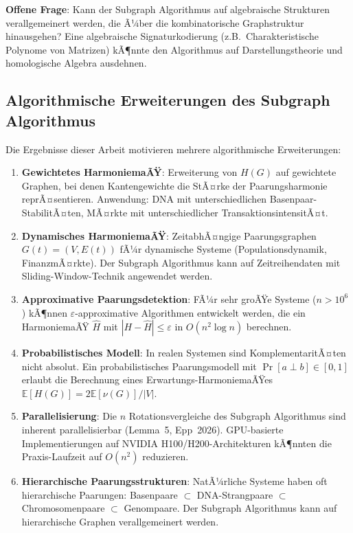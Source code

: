 ﻿\documentclass[a4paper,12pt]{article}
\theoremstyle{definition}
\begin{document}
\textbf{Offene Frage}: Kann der Subgraph Algorithmus auf algebraische Strukturen
verallgemeinert werden, die Ã¼ber die kombinatorische Graphstruktur hinausgehen?
Eine algebraische Signaturkodierung (z.B.\ Charakteristische Polynome von Matrizen)
kÃ¶nnte den Algorithmus auf Darstellungstheorie und homologische Algebra ausdehnen.

\subsection{Algorithmische Erweiterungen des Subgraph Algorithmus}

Die Ergebnisse dieser Arbeit motivieren mehrere algorithmische Erweiterungen:

\begin{enumerate}
	\item \textbf{Gewichtetes HarmoniemaÃŸ}: Erweiterung von $H(G)$ auf gewichtete
	Graphen, bei denen Kantengewichte die StÃ¤rke der Paarungsharmonie reprÃ¤sentieren.
	Anwendung: DNA mit unterschiedlichen Basenpaar-StabilitÃ¤ten, MÃ¤rkte mit
	unterschiedlicher TransaktionsintensitÃ¤t.
	
	\item \textbf{Dynamisches HarmoniemaÃŸ}: ZeitabhÃ¤ngige Paarungsgraphen
	$G(t) = (V, E(t))$ fÃ¼r dynamische Systeme (Populationsdynamik, FinanzmÃ¤rkte).
	Der Subgraph Algorithmus kann auf Zeitreihendaten mit Sliding-Window-Technik
	angewendet werden.
	
	\item \textbf{Approximative Paarungsdetektion}: FÃ¼r sehr groÃŸe Systeme
	($n > 10^6$) kÃ¶nnen $\varepsilon$-approximative Algorithmen entwickelt werden,
	die ein HarmoniemaÃŸ $\hat{H}$ mit $|H - \hat{H}| \leq \varepsilon$ in
	$O(n^2 \log n)$ berechnen.
	
	\item \textbf{Probabilistisches Modell}: In realen Systemen sind KomplementaritÃ¤ten
	nicht absolut. Ein probabilistisches Paarungsmodell mit $\Pr[a \perp b] \in [0,1]$
	erlaubt die Berechnung eines Erwartungs-HarmoniemaÃŸes
	$\mathbb{E}[H(G)] = 2\mathbb{E}[\nu(G)]/|V|$.
	
	\item \textbf{Parallelisierung}: Die $n$ Rotationsvergleiche des Subgraph Algorithmus
	sind inherent parallelisierbar (Lemma~5, Epp~2026). GPU-basierte Implementierungen
	auf NVIDIA H100/H200-Architekturen kÃ¶nnten die Praxis-Laufzeit auf $O(n^2)$
	reduzieren.
	
	\item \textbf{Hierarchische Paarungsstrukturen}: NatÃ¼rliche Systeme haben oft
	hierarchische Paarungen: Basenpaare $\subset$ DNA-Strangpaare $\subset$
	Chromosomenpaare $\subset$ Genompaare. Der Subgraph Algorithmus kann auf
	hierarchische Graphen verallgemeinert werden.
\end{enumerate}
\end{document}
